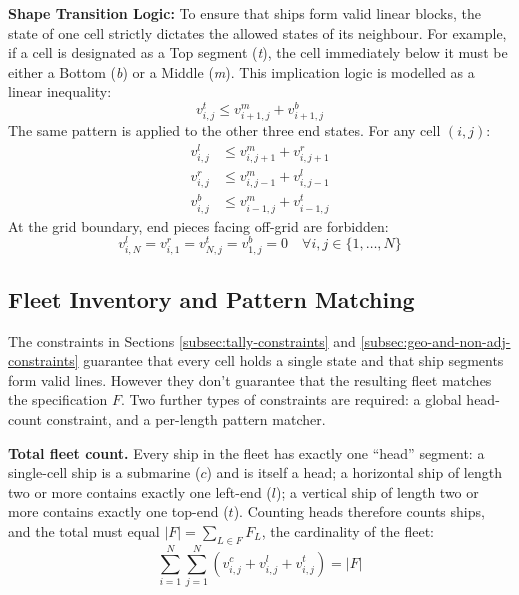 \textbf{Shape Transition Logic:}
To ensure that ships form valid linear blocks, the state of one cell strictly dictates the allowed states of its neighbour. For example, if a cell is designated as a Top segment (\textit{t}), the cell immediately below it must be either a Bottom (\textit{b}) or a Middle (\textit{m}). This implication logic is modelled as a linear inequality:
\begin{equation}\label{eq:cell-shape-transition}
    v_{i,j}^t \leq v_{i+1, j}^m + v_{i+1, j}^b
\end{equation}
The same pattern is applied to the other three end states. For any cell $(i,j)$:
\begin{align}
    v_{i,j}^l &\leq v_{i, j+1}^m + v_{i, j+1}^r \\
    v_{i,j}^r &\leq v_{i, j-1}^m + v_{i, j-1}^l \\
    v_{i,j}^b &\leq v_{i-1, j}^m + v_{i-1, j}^t
\end{align}
At the grid boundary, end pieces facing off-grid are forbidden:
\begin{equation}
    v_{i,N}^l = v_{i,1}^r = v_{N,j}^t = v_{1,j}^b = 0 \quad \forall i, j \in \{1, \dots, N\}
\end{equation}

\subsection{Fleet Inventory and Pattern Matching}\label{subsec:fleet-inventory}

The constraints in Sections \ref{subsec:tally-constraints} and \ref{subsec:geo-and-non-adj-constraints} guarantee that every cell holds a single state and that ship segments form valid lines. However they don't guarantee that the resulting fleet matches the specification $F$. Two further types of constraints are required: a global head-count constraint, and a per-length pattern matcher.

\textbf{Total fleet count.}
Every ship in the fleet has exactly one ``head'' segment: a single-cell ship is a submarine ($c$) and is itself a head; a horizontal ship of length two or more contains exactly one left-end ($l$); a vertical ship of length two or more contains exactly one top-end ($t$). Counting heads therefore counts ships, and the total must equal $|F| = \sum_{L \in F} F_L$, the cardinality of the fleet:
\begin{equation}\label{eq:cell-fleet-count}
    \sum_{i=1}^{N} \sum_{j=1}^{N} \left( v_{i,j}^c + v_{i,j}^l + v_{i,j}^t \right) = |F|
\end{equation}

